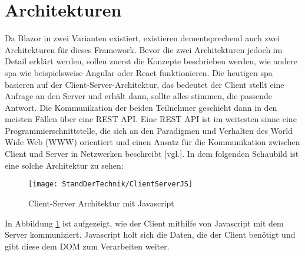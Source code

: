 \section{Architekturen}
\label{subsec:architekturen}
Da Blazor in zwei Varianten existiert, existieren dementsprechend auch zwei Architekturen für
dieses Framework. Bevor die zwei Architekturen jedoch im Detail erklärt werden, sollen zuerst die
Konzepte beschrieben werden, wie andere \ac{spa} wie beispielsweise Angular oder React
funktionieren. Die
heutigen \ac{spa} basieren auf der
Client-Server-Architektur, das bedeutet der Client stellt eine Anfrage an den Server und erhält
dann, sollte alles stimmen, die passende Antwort. Die Kommunikation der beiden Teilnehmer
geschieht dann in den meisten Fällen über eine REST API. Eine REST API ist im weitesten sinne
eine Programmierschnittstelle, die sich an den Paradigmen und Verhalten des World Wide Web
(WWW) orientiert und einen Ansatz für die Kommunikation zwischen Client und Server in Netzwerken
beschreibt \cite{RESTAPI}[vgl.].
In dem folgenden Schaubild ist eine solche Architektur zu sehen:
\begin{figure}[h]
    \centering
    \texttt{[image: StandDerTechnik/ClientServerJS]}
    \caption[Client-Server Architektur mit Javascript]{Client-Server Architektur mit Javascript}
    \label{img:clientserverjs}
\end{figure}

In Abbildung \ref{img:clientserverjs} ist aufgezeigt, wie der Client mithilfe von Javascript mit
dem Server kommuniziert. Javascript holt
sich die Daten, die der Client benötigt und gibt diese dem DOM zum Verarbeiten weiter.

